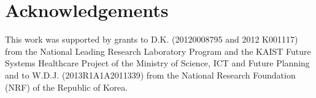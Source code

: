 \section*{Acknowledgements}

This work was supported by grants to D.K. (20120008795 and 2012 K001117) from the National Leading Research Laboratory Program and the KAIST Future Systems Healthcare Project of the Ministry of Science, ICT and Future Planning and to W.D.J. (2013R1A1A2011339) from the National Research Foundation (NRF) of the Republic of Korea.
